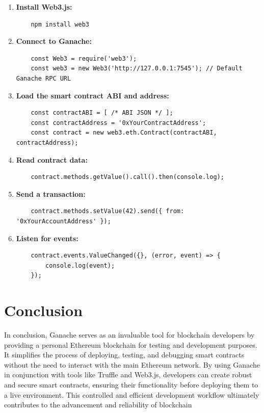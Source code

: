\documentclass[11pt]{article}
\begin{document}
\begin{enumerate}
    \item \textbf{Install Web3.js:} 
    \begin{verbatim}
    npm install web3
    \end{verbatim}
    \item \textbf{Connect to Ganache:} 
    \begin{verbatim}
    const Web3 = require('web3');
    const web3 = new Web3('http://127.0.0.1:7545'); // Default Ganache RPC URL
    \end{verbatim}
    \item \textbf{Load the smart contract ABI and address:} 
    \begin{verbatim}
    const contractABI = [ /* ABI JSON */ ];
    const contractAddress = '0xYourContractAddress';
    const contract = new web3.eth.Contract(contractABI, contractAddress);
    \end{verbatim}
    \item \textbf{Read contract data:} 
    \begin{verbatim}
    contract.methods.getValue().call().then(console.log);
    \end{verbatim}
    \item \textbf{Send a transaction:} 
    \begin{verbatim}
    contract.methods.setValue(42).send({ from: '0xYourAccountAddress' });
    \end{verbatim}
    \item \textbf{Listen for events:} 
    \begin{verbatim}
    contract.events.ValueChanged({}, (error, event) => {
        console.log(event);
    });
    \end{verbatim}
\end{enumerate}



\section{Conclusion}

In conclusion, Ganache serves as an invaluable tool for blockchain developers by providing a personal Ethereum blockchain for testing and development purposes. It simplifies the process of deploying, testing, and debugging smart contracts without the need to interact with the main Ethereum network. By using Ganache in conjunction with tools like Truffle and Web3.js, developers can create robust and secure smart contracts, ensuring their functionality before deploying them to a live environment. This controlled and efficient development workflow ultimately contributes to the advancement and reliability of blockchain
\
\end{document}
